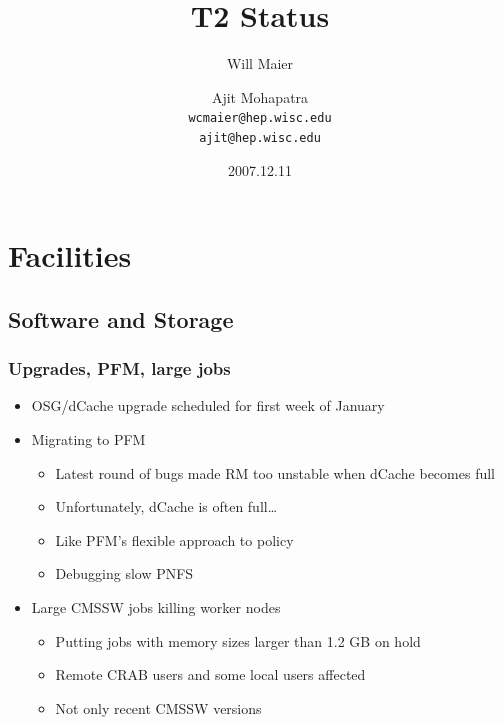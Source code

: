 \documentclass{beamer}
\title{T2 Status}
\author[Maier, Mohapatra]{
    Will Maier \and Ajit Mohapatra\\ 
    {\tt wcmaier@hep.wisc.edu}\\
    {\tt ajit@hep.wisc.edu}}
\institute[Wisconsin]{University of Wisconsin - High Energy Physics}
\date{2007.12.11}
\begin{document}
\begin{frame}
    \titlepage
\end{frame}


\section{Facilities}
\subsection{Software and Storage}
\begin{frame}
\frametitle{Upgrades, PFM, large jobs}
\begin{itemize}
    \item OSG/dCache upgrade scheduled for first week of January
    \item Migrating to PFM
    \begin{itemize}
        \item Latest round of bugs made RM too unstable when dCache becomes full
        \item Unfortunately, dCache is often full\ldots{}
        \item Like PFM's flexible approach to policy 
        \item Debugging slow PNFS
    \end{itemize}
    \item Large CMSSW jobs killing worker nodes
    \begin{itemize}
        \item Putting jobs with memory sizes larger than 1.2 GB on hold
        \item Remote CRAB users and some local users affected
        \item Not only recent CMSSW versions
    \end{itemize}
\end{itemize}
\end{frame}
\end{document}
